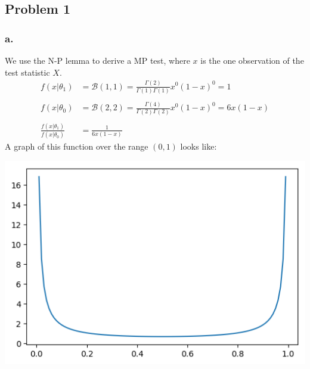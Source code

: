 \documentclass{article}
\begin{document}
\setlength{\headheight}{4\baselineskip}



\subsection*{Problem 1}
\subsubsection*{a.}
We use the N-P lemma to derive a MP test, where $x$ is the one observation of the test statistic $X$.
\begin{align*}
f(x|\theta_1) &= \mathcal{B}(1,1) = \frac{\Gamma(2)}{\Gamma(1)\Gamma(1)}x^0(1-x)^0 = 1 \\ \\
f(x|\theta_0) &= \mathcal{B}(2,2) = \frac{\Gamma(4)}{\Gamma(2)\Gamma(2)}x^0(1-x)^0 = 6x(1-x) \\ \\
\frac{f(x|\theta_1)}{f(x|\theta_0)} &= \frac{1}{6x(1-x)}
\end{align*}
A graph of this function over the range $(0,1)$ looks like:

\begin{center}\includegraphics[scale=0.8]{hw6_1_graph}\end{center}
\end{document}
